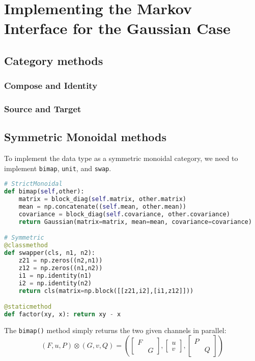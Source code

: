 \section{Implementing the Markov Interface for the Gaussian Case}
    \subsection{Category methods}
	\subsubsection{Compose and Identity}
	\subsubsection{Source and Target}
\subsection{Symmetric Monoidal methods}
To implement the data type as a symmetric monoidal category, we need to implement \lstinline{bimap}, \lstinline{unit}, and \lstinline{swap}.


\begin{lstlisting}[float, floatplacement=H, caption=Gaussian implementations of the bifunctor and swap isomorphism, label=kalman-monoidal, language=Python, frame=single]
# StrictMonoidal
def bimap(self,other):
	matrix = block_diag(self.matrix, other.matrix)
	mean = np.concatenate((self.mean, other.mean))
	covariance = block_diag(self.covariance, other.covariance)
	return Gaussian(matrix=matrix, mean=mean, covariance=covariance)

# Symmetric
@classmethod
def swapper(cls, n1, n2):
	z21 = np.zeros((n2,n1))
	z12 = np.zeros((n1,n2))
	i1 = np.identity(n1)
	i2 = np.identity(n2)
	return cls(matrix=np.block([[z21,i2],[i1,z12]]))

@staticmethod
def factor(xy, x): return xy - x
\end{lstlisting}

The \lstinline{bimap()} method simply returns the two given channels in parallel:
\begin{equation}
	(F,u,P) \otimes (G,v,Q) = \left(
	\begin{bmatrix} F & \\ & G \end{bmatrix},
	\begin{bmatrix} u \\ v \end{bmatrix},
	\begin{bmatrix} P & \\ & Q \end{bmatrix}\right)
\end{equation}

